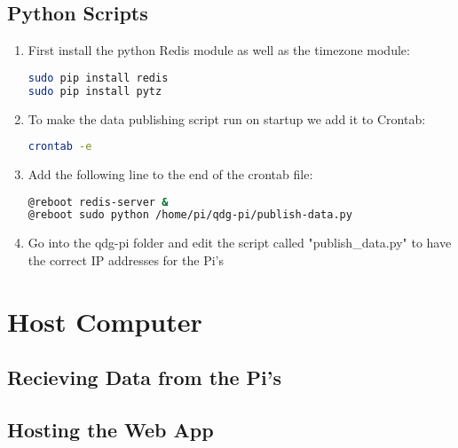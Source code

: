 \documentclass[a4paper,12pt]{article}
\begin{document}
\subsection{Python Scripts}

\begin{enumerate}
\item First install the python Redis module as well as the timezone module:
\begin{lstlisting}[language=bash]
sudo pip install redis
sudo pip install pytz
\end{lstlisting}
\item To make the data publishing script run on startup we add it to Crontab:
\begin{lstlisting}[language=bash]
crontab -e
\end{lstlisting}
\item Add the following line to the end of the crontab file:
\begin{lstlisting}[language=bash]
@reboot redis-server &
@reboot sudo python /home/pi/qdg-pi/publish-data.py
\end{lstlisting}

\item Go into the qdg-pi folder and edit the script called "publish\_data.py" to have the correct IP addresses for the Pi's


\end{enumerate}

\section{Host Computer}
\subsection{Recieving Data from the Pi's}

\subsection{Hosting the Web App}
\end{document}
